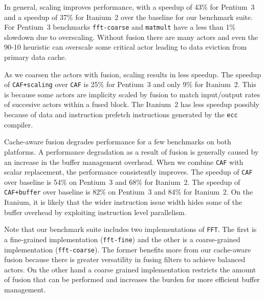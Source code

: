 In general, scaling improves performance, with a speedup of 
43\% for Pentium~3 and a speedup of 37\% for Itanium~2 over the baseline
for our benchmark suite. For Pentium~3 benchmarks \texttt{fft-coarse} and 
\texttt{matmult} have a less than 1\% slowdown due to overscaling. 
Without fusion there are many actors and even the 90-10 heuristic can 
overscale some critical actor leading to data eviction from primary 
data cache.

As we coarsen the actors with fusion, scaling results in less speedup.
The speedup of \texttt{CAF+scaling} over \texttt{CAF} is
25\% for Pentium~3 and only 9\% for Itanium~2. This is because some actors
are implicity scaled by fusion to match input/output rates of succesive 
actors within a fused block. The Itanium~2 has less speedup possibly
because of data and instruction prefetch instructions generated by the 
\texttt{ecc} compiler.




Cache-aware fusion degrades performance for a few benchmarks on both platforms.
A performance degradation as a result of fusion is generally caused by
an increase in the buffer management overhead. When
we combine \texttt{CAF} with scalar replacement, the
performance consistently improves. 
The speedup of \texttt{CAF} over baseline is 54\% on Pentium~3
and 68\% for Itanium~2. 
The speedup of \texttt{CAF+buffer} over baseline is 82\% on Pentium~3
and 84\% for Itanium~2. 
On the Itanium, it is likely that
the wider instruction issue width hides some of the buffer overhead by
exploiting instruction level parallelism.

Note that our benchmark suite
includes two implementations of \texttt{FFT}. The first is a
fine-grained implementation (\texttt{fft-fine}) and the other is a
coarse-grained implementation (\texttt{fft-coarse}). The former
benefits more from our cache-aware fusion because there is greater
versatility in fusing filters to achieve balanced actors. On the other hand
a coarse grained implementation restricts the amount of fusion that
can be performed and increases the burden for more efficient buffer
management. 

